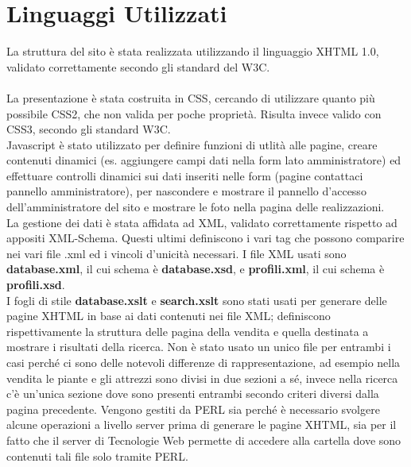 \section{Linguaggi Utilizzati}{
	La struttura del sito è stata realizzata utilizzando il linguaggio XHTML 1.0, validato correttamente secondo gli standard del W3C. \\
	\\
	La presentazione è stata costruita in CSS, cercando di utilizzare quanto più possibile CSS2, che non valida per poche proprietà. Risulta invece valido con CSS3, secondo gli standard W3C.
	\\
	Javascript è stato utilizzato per definire funzioni di utlità alle pagine, creare contenuti dinamici (es. aggiungere campi dati nella form lato amministratore) ed effettuare controlli dinamici sui dati inseriti nelle form (pagine contattaci pannello amministratore), per nascondere e mostrare il pannello d'accesso dell'amministratore del sito e mostrare le foto nella pagina delle realizzazioni.
	\\
	La gestione dei dati è stata affidata ad XML, validato correttamente rispetto ad appositi XML-Schema. Questi ultimi definiscono i vari tag che possono comparire nei vari file .xml ed i vincoli d'unicità necessari. I file XML usati sono \textbf{database.xml}, il cui schema è \textbf{database.xsd}, e \textbf{profili.xml}, il cui schema è \textbf{profili.xsd}.\\
	I fogli di stile \textbf{database.xslt} e \textbf{search.xslt} sono stati usati per generare delle pagine XHTML in base ai dati contenuti nei file XML; definiscono rispettivamente la struttura delle pagina della vendita e quella destinata a mostrare i risultati della ricerca. Non è stato usato un unico file per entrambi i casi perché ci sono delle notevoli differenze di rappresentazione, ad esempio nella vendita le piante e gli attrezzi sono divisi in due sezioni a sé, invece nella ricerca c'è un'unica sezione dove sono presenti entrambi secondo criteri diversi dalla pagina precedente.
	Vengono gestiti da PERL sia perché è necessario svolgere alcune operazioni a livello server prima di generare le pagine XHTML, sia per il fatto che il server di Tecnologie Web permette di accedere alla cartella dove sono contenuti tali file solo tramite PERL.
	\\
}
